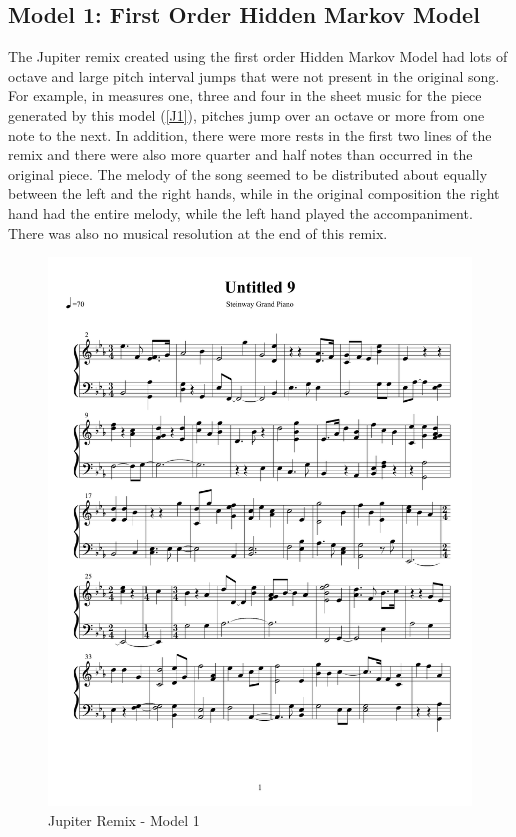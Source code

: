 \documentclass{article} %
\begin{document}
\subsection{Model 1: First Order Hidden Markov Model}

The Jupiter remix created using the first order Hidden Markov Model had lots of octave and large pitch interval jumps that were not present in the original song. For example, in measures one, three and four in the sheet music for the piece generated by this model (\autoref{J1}),  pitches jump over an octave or more from one note to the next.  In addition, there were more rests in the first two lines of the remix and there were also more quarter and half notes than occurred in the original piece. The melody of the song seemed to be distributed about equally between the left and the right hands, while in the original composition the right hand had the entire melody, while the left hand played the accompaniment.  There was also no musical resolution at the end of this remix.

\begin{figure}[H]
\centering

\includegraphics [scale = 0.6] {JupiterRemix-cropped.pdf}
\caption{Jupiter Remix - Model 1\label{J1}}
\end{figure}
\end{document}
